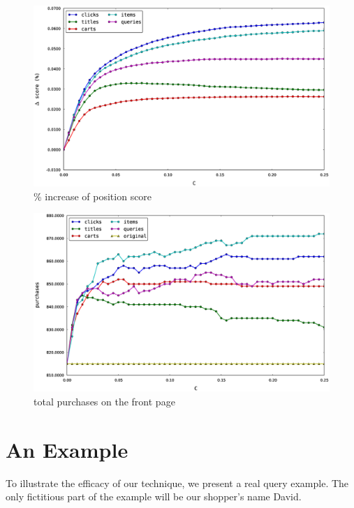 \documentclass{article}
\begin{document}
\begin{figure}[htbp!]
\centering
\includegraphics[width=\textwidth]{000050_0.48chunk.k100.i2.n100.percent_increase_position_score.0-0.25.eps}
\caption{\% increase of position score}
    \label{fig:percent_increase_of_position_score}
\end{figure}

\begin{figure}[htbp!]
\centering
\includegraphics[width=\textwidth]{000050_0.48chunk.k100.i2.n100.total_purchased_front_page.0-0.25.eps}
\caption{total purchases on the front page}
\label{fig:total_purchases_on_the_front_page}
\end{figure}

\section{An Example}

To illustrate the efficacy of our technique, we present a real query example.
The only fictitious part of the example will be our shopper's name David.
\end{document}
